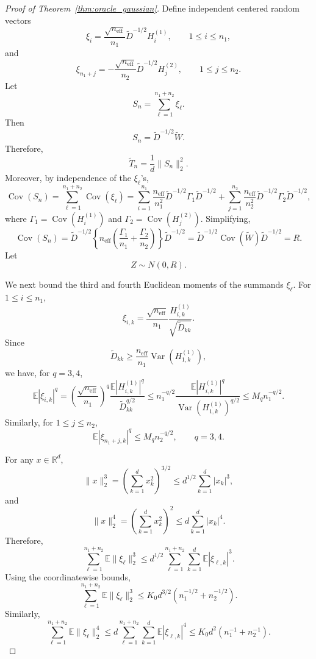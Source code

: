 \documentclass[
  12pt]{article}
\theoremstyle{plain}
\theoremstyle{definition}
\theoremstyle{remark}
\begin{document}
\begin{proof}[Proof of Theorem~\ref{thm:oracle_gaussian}]
Define independent centered random vectors
\[
\xi_i
=
\frac{\sqrt{n_{\mathrm{eff}}}}{n_1}
\widetilde D^{-1/2}H_i^{(1)},
\qquad
1\le i\le n_1,
\]
and
\[
\xi_{n_1+j}
=
-
\frac{\sqrt{n_{\mathrm{eff}}}}{n_2}
\widetilde D^{-1/2}H_j^{(2)},
\qquad
1\le j\le n_2.
\]
Let
\[
S_n
=
\sum_{\ell=1}^{n_1+n_2}\xi_\ell.
\]
Then
\begin{equation}
\label{eq:supp-oracle-standardized-sum}
S_n
=
\widetilde D^{-1/2}\widetilde W.
\end{equation}
Therefore,
\begin{equation}
\label{eq:supp-oracle-statistic}
\widetilde T_n
=
\frac1d\|S_n\|_2^2.
\end{equation}
Moreover, by independence of the \(\xi_\ell\)'s,
\[
\operatorname{Cov}(S_n)
=
\sum_{\ell=1}^{n_1+n_2}\operatorname{Cov}(\xi_\ell)
=
\sum_{i=1}^{n_1}\frac{n_{\mathrm{eff}}}{n_1^2}
\widetilde D^{-1/2}\Gamma_1\widetilde D^{-1/2}
+
\sum_{j=1}^{n_2}\frac{n_{\mathrm{eff}}}{n_2^2}
\widetilde D^{-1/2}\Gamma_2\widetilde D^{-1/2},
\]
where \(\Gamma_1=\operatorname{Cov}(H_i^{(1)})\) and
\(\Gamma_2=\operatorname{Cov}(H_j^{(2)})\). Simplifying,
\[
\operatorname{Cov}(S_n)
=
\widetilde D^{-1/2}
\left\{
n_{\mathrm{eff}}
\left(
\frac{\Gamma_1}{n_1}
+
\frac{\Gamma_2}{n_2}
\right)
\right\}
\widetilde D^{-1/2}
=
\widetilde D^{-1/2}
\operatorname{Cov}(\widetilde W)
\widetilde D^{-1/2}
=
R.
\]
Let
\[
Z\sim N(0,R).
\]

We next bound the third and fourth Euclidean moments of the summands
\(\xi_\ell\). For \(1\le i\le n_1\),
\[
\xi_{i,k}
=
\frac{\sqrt{n_{\mathrm{eff}}}}{n_1}
\frac{H_{i,k}^{(1)}}{\sqrt{\widetilde D_{kk}}}.
\]
Since
\[
\widetilde D_{kk}
\ge
\frac{n_{\mathrm{eff}}}{n_1}
\operatorname{Var}(H_{1,k}^{(1)}),
\]
we have, for \(q=3,4\),
\[
\mathbb E|\xi_{i,k}|^q
=
\left(\frac{\sqrt{n_{\mathrm{eff}}}}{n_1}\right)^q
\frac{\mathbb E|H_{i,k}^{(1)}|^q}{\widetilde D_{kk}^{q/2}}
\le
n_1^{-q/2}
\frac{\mathbb E|H_{i,k}^{(1)}|^q}
{\operatorname{Var}(H_{1,k}^{(1)})^{q/2}}
\le
M_q n_1^{-q/2}.
\]
Similarly, for \(1\le j\le n_2\),
\[
\mathbb E|\xi_{n_1+j,k}|^q
\le
M_q n_2^{-q/2},
\qquad q=3,4.
\]

For any \(x\in\mathbb R^d\),
\[
\|x\|_2^3
=
\left(\sum_{k=1}^d x_k^2\right)^{3/2}
\le
d^{1/2}\sum_{k=1}^d |x_k|^3,
\]
and
\[
\|x\|_2^4
=
\left(\sum_{k=1}^d x_k^2\right)^2
\le
d\sum_{k=1}^d |x_k|^4.
\]
Therefore,
\[
\sum_{\ell=1}^{n_1+n_2}
\mathbb E\|\xi_\ell\|_2^3
\le
d^{1/2}
\sum_{\ell=1}^{n_1+n_2}
\sum_{k=1}^d
\mathbb E|\xi_{\ell,k}|^3.
\]
Using the coordinatewise bounds,
\begin{equation}
\label{eq:supp-oracle-third-moment}
\sum_{\ell=1}^{n_1+n_2}
\mathbb E\|\xi_\ell\|_2^3
\le
K_0 d^{3/2}
\left(
n_1^{-1/2}+n_2^{-1/2}
\right).
\end{equation}
Similarly,
\begin{equation}
\label{eq:supp-oracle-fourth-moment}
\sum_{\ell=1}^{n_1+n_2}
\mathbb E\|\xi_\ell\|_2^4
\le
d
\sum_{\ell=1}^{n_1+n_2}
\sum_{k=1}^d
\mathbb E|\xi_{\ell,k}|^4
\le
K_0 d^2
\left(
n_1^{-1}+n_2^{-1}
\right).
\end{equation}


\end{proof}
\end{document}
